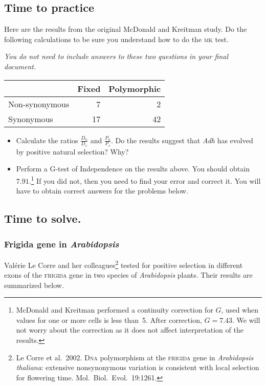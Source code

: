 \documentclass[12pt, addpoints, hidelinks]{exam}
\begin{document}
\subsection*{Time to practice}

Here are the results from the original McDonald and Kreitman study. Do the following calculations to be sure you understand how to do the \textsc{mk} test.

\emph{You do not need to include answers to these two questions in your final document.}

\begin{tabular}{@{}lrr@{}}
\toprule
 & Fixed & Polymorphic \\
\midrule
Non-synonymous	&	7 	&	2 	\\
Synonymous		&	17 	&	42	\\
\bottomrule
\end{tabular}

\begin{itemize}
\item Calculate the ratios $\frac{D_n}{D_s}$ and $\frac{P_n}{P_s}$. Do the results suggest that \textit{Adh} has evolved by positive natural selection? Why?

\item Perform a G-test of Independence on the results above. You should obtain $7.91$.\footnote{McDonald and Kreitman performed a continuity correction for $G$, used when values for one or more cells is less than~5. After correction, $G= 7.43$. We will not worry about the correction as it does not affect interpretation of the results.}
If you did not, then you need to find your error and correct it. You will have to obtain correct answers for the problems below.
\end{itemize}


\subsection*{Time to solve.}

\subsubsection*{Frigida gene in \textit{Arabidopsis}}

Valérie Le Corre and her colleagues\footnote{Le Corre et al.~2002. D\textsc{na} polymorphism at the \textsc{frigida} gene in \textit{Arabidopsis thaliana}: extensive nonsynonymous variation is consistent with local selection for
flowering time. Mol.~Biol.~Evol.~19:1261.} tested for positive selection in different exons of the \textsc{frigida} gene in two species of \textit{Arabidopsis} plants. Their results are summarized below.
\end{document}
